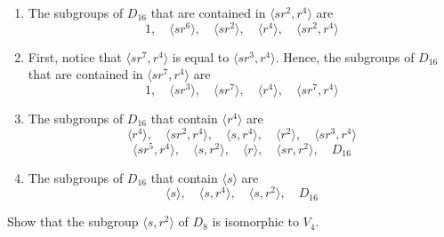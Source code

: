 \begin{solution}
    \begin{enumerate}[label = \textbf{(\alph*)}]
        \item The subgroups of $D_{16}$ that are contained in $\langle sr^2, r^4 \rangle$ are 
        $$1, \quad \langle sr^6\rangle, \quad \langle sr^2 \rangle, \quad \langle r^4 \rangle, \quad \langle sr^2, r^4 \rangle$$
        \item First, notice that $\langle sr^7, r^4 \rangle$ is equal to $\langle sr^3, r^4 \rangle$. Hence, the subgroups of $D_{16}$ that are contained in $\langle sr^7, r^4 \rangle$ are 
        $$1, \quad \langle sr^3\rangle, \quad \langle sr^7 \rangle, \quad \langle r^4 \rangle, \quad \langle sr^7, r^4 \rangle$$
        \item The subgroups of $D_{16}$ that contain $\langle r^4 \rangle$ are 
        $$\langle r^4 \rangle, \quad \langle sr^2, r^4\rangle, \quad \langle s, r^4\rangle, \quad \langle r^2\rangle, \quad \langle sr^3, r^4\rangle$$
        $$\langle sr^5, r^4\rangle, \quad \langle s, r^2\rangle, \quad \langle r \rangle, \quad \langle sr, r^2\rangle, \quad D_{16}$$
        \item The subgroups of $D_{16}$ that contain $\langle s \rangle$ are 
        $$\langle s \rangle, \quad \langle s, r^4\rangle, \quad \langle s, r^2\rangle, \quad D_{16}$$
    \end{enumerate}
\end{solution}

\begin{exercise}
    Show that the subgroup $\langle s, r^2\rangle$ of $D_8$ is isomorphic to $V_4$. \\
\end{exercise}


